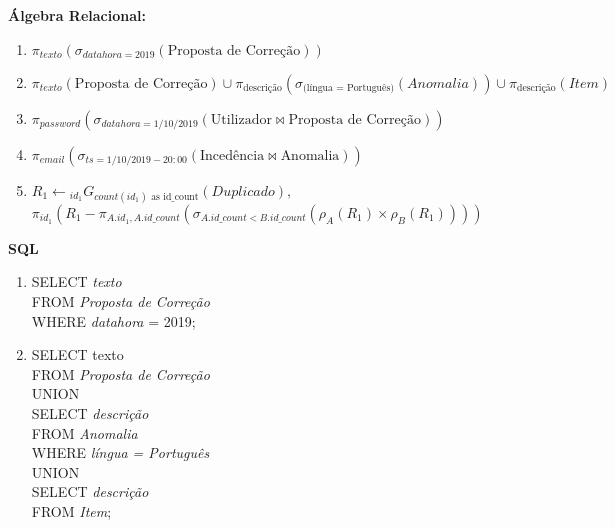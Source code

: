 \documentclass[12pt]{report}
\begin{document}
\newpage
\Large
\textbf{Álgebra Relacional: }\\

\large

\begin{enumerate}
	\item $\pi_{texto}(\sigma_{datahora = 2019}(\text{Proposta de Correção}))$
	\item $\pi_{texto}(\text{Proposta de Correção}) \cup \pi_{\text{descrição}}(\sigma_{\text{(língua = Português)}}(Anomalia)) \cup
		\pi_{\text{descrição}}(Item)$
	\item $\pi_{password}(\sigma_{datahora = 1/10/2019}(\text{Utilizador}\bowtie\text{Proposta de Correção}))$
	\item $\pi_{email}(\sigma_{ts = 1/10/2019 - 20:00}(\text{Incedência}\bowtie\text{Anomalia}))$
	\item $R_{1} \gets {_{id_{1}}G_{count(id_{1}) \text{ as id\_count}}}(Duplicado),$\\
		$ \pi_{id_{1}}(R_{1} - \pi_{A.id_{1}, A.id\_count}(\sigma_{A.id\_count < B.id\_count}(\rho_{A}(R_{1}) \times \rho_{B}(R_{1}))))$
\end{enumerate}

\Large
\textbf{SQL}

\normalsize

\begin{enumerate}
	\item SELECT \textit{texto} \\
		FROM \textit{Proposta de Correção} \\
		WHERE \textit{datahora} = 2019;
	\item SELECT texto \\
		FROM \textit{Proposta de Correção} \\
		UNION \\
		SELECT \textit{descrição} \\
		FROM \textit{Anomalia} \\
		WHERE \textit{língua = Português} \\
		UNION \\
		SELECT \textit{descrição} \\
		FROM \textit{Item};
\end{enumerate}
\end{document}
